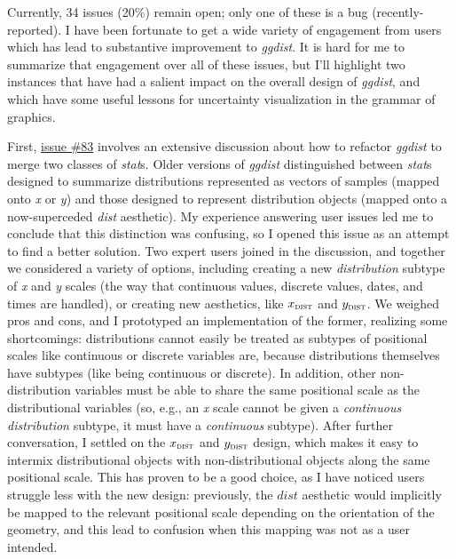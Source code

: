 \documentclass[journal]{vgtc}                     %
\begin{document}
Currently, 34 issues (20\%) remain open; only one of these is a bug (recently-reported). 
I have been fortunate to get a wide variety of engagement from users which has lead to substantive improvement to \textit{ggdist}. It is hard for me to summarize that engagement over all of these issues, but I'll highlight two instances that have had a salient impact on the overall design of \textit{ggdist}, and which have some useful lessons for uncertainty visualization in the grammar of graphics.

First, \href{https://github.com/mjskay/ggdist/issues/83}{issue \#83} involves an extensive discussion about how to refactor \textit{ggdist} to merge two classes of \textit{stat}s. Older versions of \textit{ggdist} distinguished between \textit{stat}s designed to summarize distributions represented as vectors of samples (mapped onto \textit{x} or \textit{y}) and those designed to represent distribution objects (mapped onto a now-superceded \textit{dist} aesthetic). My experience answering user issues led me to conclude that this distinction was confusing, so I opened this issue as an attempt to find a better solution. Two expert users joined in the discussion, and together we considered a variety of options, including creating a new \textit{distribution} subtype of \textit{x} and \textit{y} scales (the way that continuous values, discrete values, dates, and times are handled), or creating new aesthetics, like $x_\textsc{dist}$ and $y_\textsc{dist}$. We weighed pros and cons, and I prototyped an implementation of the former, realizing some shortcomings: distributions cannot easily be treated as subtypes of positional scales like continuous or discrete variables are, because distributions themselves have subtypes (like being continuous or discrete). In addition, other non-distribution variables must be able to share the same positional scale as the distributional variables (so, e.g., an \textit{x} scale cannot be given a \textit{continuous distribution} subtype, it must have a \textit{continuous} subtype). After further conversation, I settled on the $x_\textsc{dist}$ and $y_\textsc{dist}$ design, which makes it easy to intermix distributional objects with non-distributional objects along the same positional scale. This has proven to be a good choice, as I have noticed users struggle less with the new design: previously, the $\textit{dist}$ aesthetic would implicitly be mapped to the relevant positional scale depending on the orientation of the geometry, and this lead to confusion when this mapping was not as a user intended.
\end{document}
